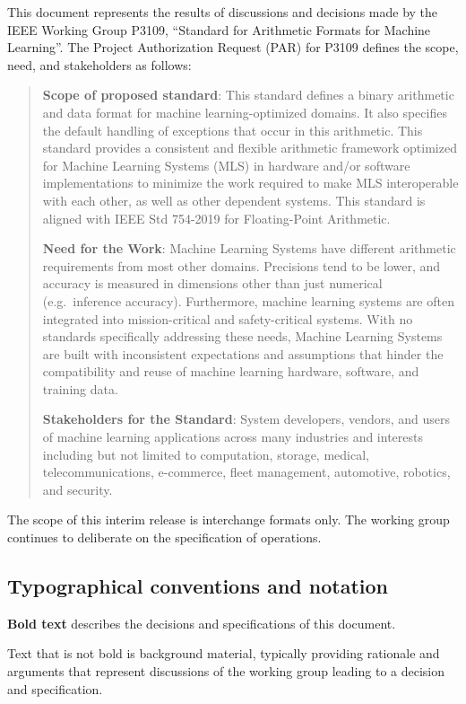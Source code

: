 \documentclass{article}
\newcommand{\spec}[1]{{\bf #1}}
\begin{document}
This document represents the results of discussions and decisions made by the IEEE Working Group P3109, ``Standard for Arithmetic Formats for Machine Learning''.
The Project Authorization Request (PAR) for P3109 defines the scope, need, and stakeholders as follows:
\begin{quote}
{\bf Scope of proposed standard}: 
This standard defines a binary arithmetic and data format for machine learning-optimized domains.
It also specifies the default handling of exceptions that occur in this arithmetic.
This standard provides a consistent and flexible arithmetic framework optimized for Machine Learning Systems (MLS) in hardware and/or software implementations to minimize the work required to make MLS interoperable with each other, as well as other dependent systems.
This standard is aligned with IEEE Std 754-2019 for Floating-Point Arithmetic.

{\bf Need for the Work}:
Machine Learning Systems have different arithmetic requirements from most other domains. Precisions tend to be lower, and accuracy is measured in dimensions other than just numerical (e.g.\ inference accuracy).
Furthermore, machine learning systems are often integrated into mission-critical and safety-critical systems.
With no standards specifically addressing these needs, Machine Learning Systems are built with inconsistent expectations and assumptions that hinder the compatibility and reuse of machine learning hardware, software, and training data.

{\bf Stakeholders for the Standard}:
System developers, vendors, and users of machine learning applications across many industries and interests including but not limited to computation, storage, medical, telecommunications, e-commerce, fleet management, automotive, robotics, and security.
\end{quote}
The scope of this interim release is interchange formats only.  The working group continues to deliberate on the specification of operations.

\subsection{Typographical conventions and notation}

\spec{Bold text} describes the decisions and specifications of this document.

Text that is not bold is background material, typically providing rationale and arguments that represent discussions of the working group leading to a decision and specification.
\end{document}

